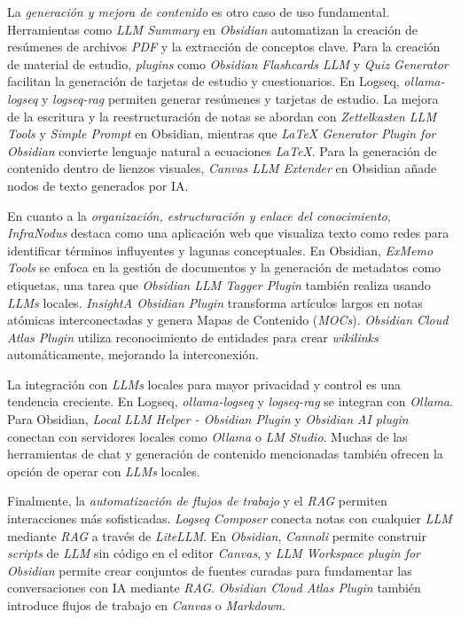 La \textit{generación y mejora de contenido} es otro caso de uso fundamental. Herramientas como \textit{LLM Summary} en \textit{Obsidian} automatizan la creación de resúmenes de archivos \textit{PDF} y la extracción de conceptos clave. Para la creación de material de estudio, \textit{plugins} como \textit{Obsidian Flashcards LLM} y \textit{Quiz Generator} facilitan la generación de tarjetas de estudio y cuestionarios. En Logseq, \textit{ollama-logseq} y \textit{logseq-rag} permiten generar resúmenes y tarjetas de estudio. La mejora de la escritura y la reestructuración de notas se abordan con \textit{Zettelkasten LLM Tools} y \textit{Simple Prompt} en Obsidian, mientras que \textit{LaTeX Generator Plugin for Obsidian} convierte lenguaje natural a ecuaciones \textit{LaTeX}. Para la generación de contenido dentro de lienzos visuales, \textit{Canvas LLM Extender} en Obsidian añade nodos de texto generados por IA.

En cuanto a la \textit{organización, estructuración y enlace del conocimiento}, \textit{InfraNodus} destaca como una aplicación web que visualiza texto como redes para identificar términos influyentes y lagunas conceptuales. En Obsidian, \textit{ExMemo Tools} se enfoca en la gestión de documentos y la generación de metadatos como etiquetas, una tarea que \textit{Obsidian LLM Tagger Plugin} también realiza usando \textit{LLMs} locales. \textit{InsightA Obsidian Plugin} transforma artículos largos en notas atómicas interconectadas y genera Mapas de Contenido (\textit{MOCs}). \textit{Obsidian Cloud Atlas Plugin} utiliza reconocimiento de entidades para crear \textit{wikilinks} automáticamente, mejorando la interconexión.

La integración con \textit{LLMs} locales para mayor privacidad y control es una tendencia creciente. En Logseq, \textit{ollama-logseq} y \textit{logseq-rag} se integran con \textit{Ollama}. Para Obsidian, \textit{Local LLM Helper - Obsidian Plugin} y \textit{Obsidian AI plugin} conectan con servidores locales como \textit{Ollama} o \textit{LM Studio}. Muchas de las herramientas de chat y generación de contenido mencionadas también ofrecen la opción de operar con \textit{LLMs} locales.

Finalmente, la \textit{automatización de flujos de trabajo} y el \textit{RAG} permiten interacciones más sofisticadas. \textit{Logseq Composer} conecta notas con cualquier \textit{LLM} mediante \textit{RAG} a través de \textit{LiteLLM}. En \textit{Obsidian}, \textit{Cannoli} permite construir \textit{scripts} de \textit{LLM} sin código en el editor \textit{Canvas}, y \textit{LLM Workspace plugin for Obsidian} permite crear conjuntos de fuentes curadas para fundamentar las conversaciones con IA mediante \textit{RAG}. \textit{Obsidian Cloud Atlas Plugin} también introduce flujos de trabajo en \textit{Canvas} o \textit{Markdown}.


